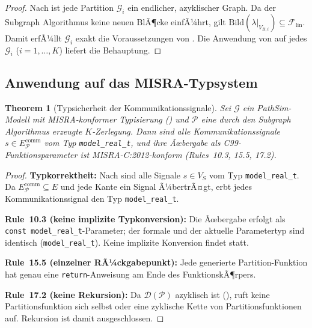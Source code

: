﻿\documentclass[12pt,a4paper]{article}
\newtheorem{theorem}{Theorem}[section]
\theoremstyle{definition}
\begin{document}
\begin{proof}
Nach  ist jede Partition $\mathcal{G}_i$ ein endlicher,
azyklischer Graph. Da der Subgraph Algorithmus keine neuen BlÃ¶cke einfÃ¼hrt,
gilt $\mathrm{Bild}(\lambda|_{V_{B,i}}) \subseteq \mathcal{F}_{\mathrm{lin}}$.
Damit erfÃ¼llt $\mathcal{G}_i$ exakt die Voraussetzungen von .
Die Anwendung von  auf jedes $\mathcal{G}_i$
($i = 1, \ldots, K$) liefert die Behauptung.
\end{proof}

\subsection{Anwendung auf das MISRA-Typsystem}
\label{subsec:subgraph-misra}

\begin{theorem}[Typsicherheit der Kommunikationssignale]
\label{thm:subgraph-type}
Sei $\mathcal{G}$ ein PathSim-Modell mit MISRA-konformer Typisierung
() und $\mathcal{P}$ eine durch den Subgraph Algorithmus
erzeugte $K$-Zerlegung. Dann sind alle Kommunikationssignale
$s \in E_{\mathcal{P}}^{\mathrm{comm}}$ vom Typ
\texttt{model\_real\_t}, und ihre Ãœbergabe als C99-Funktionsparameter ist
MISRA-C:2012-konform (Rules~10.3, 15.5, 17.2).
\end{theorem}

\begin{proof}
\textbf{Typkorrektheit:}
Nach  sind alle Signale $s \in V_S$ vom Typ
\texttt{model\_real\newline \_t}. Da $E_{\mathcal{P}}^{\mathrm{comm}} \subseteq E$
und jede Kante ein Signal Ã¼bertrÃ¤gt, erbt jedes Kommunikationssignal
den Typ \texttt{model\_real\_t}.

\textbf{Rule~10.3 (keine implizite Typkonversion):}
Die Ãœbergabe erfolgt als \texttt{const model\_real\_t}-Parameter; der
formale und der aktuelle Parametertyp sind identisch (\texttt{model\_real\_t}).
Keine implizite Konversion findet statt.

\textbf{Rule~15.5 (einzelner RÃ¼ckgabepunkt):}
Jede generierte Partition-Funktion hat genau eine \texttt{return}-Anweisung
am Ende des FunktionskÃ¶rpers.

\textbf{Rule~17.2 (keine Rekursion):}
Da $\mathcal{D}(\mathcal{P})$ azyklisch ist (),
ruft keine Partitionsfunktion sich selbst oder eine zyklische Kette
von Partitionsfunktionen auf. Rekursion ist damit ausgeschlossen.
\end{proof}
\end{document}

